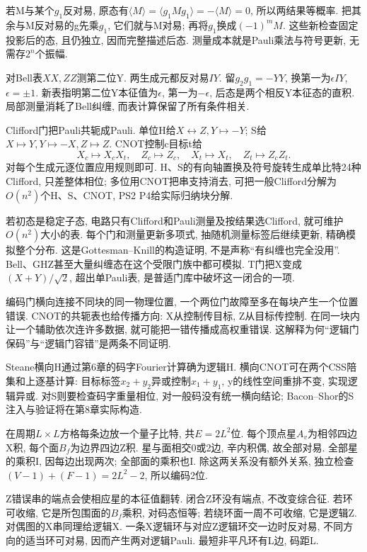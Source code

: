 若M与某个$g_1$反对易, 原态有$\langle M\rangle=\langle g_1Mg_1\rangle=-\langle M\rangle=0$, 所以两结果等概率. 把其余与M反对易的g先乘$g_1$, 它们就与M对易; 再将$g_1$换成$(-1)^mM$. 这些新检查固定投影后的态, 且仍独立, 因而完整描述后态. 测量成本就是Pauli乘法与符号更新, 无需存$2^n$个振幅.

\begin{example}对Bell表$XX,ZZ$测第二位Y. 两生成元都反对易$IY$. 留$g_2g_1=-YY$, 换第一为$\epsilon IY$, $\epsilon=\pm1$. 新表指明第二位Y本征值为$\epsilon$, 第一为$-\epsilon$, 后态是两个相反Y本征态的直积. 局部测量消耗了Bell纠缠, 而表计算保留了所有条件相关.\end{example}

Clifford门把Pauli共轭成Pauli. 单位H给$X\leftrightarrow Z,Y\mapsto-Y$; S给$X\mapsto Y,Y\mapsto-X,Z\mapsto Z$. CNOT控制c目标t给
\[X_c\mapsto X_cX_t,\quad Z_c\mapsto Z_c,\quad
X_t\mapsto X_t,\quad Z_t\mapsto Z_cZ_t.\]
对每个生成元逐位置应用规则即可. H、S的有向轴置换及符号旋转生成单比特24种Clifford, 只差整体相位; 多位用CNOT把串支持消去, 可把一般Clifford分解为$O(n^2)$个H、S、CNOT, PS2 P4给实际归纳块分解.

若初态是稳定子态, 电路只有Clifford和Pauli测量及按结果选Clifford, 就可维护$O(n^2)$大小的表. 每个门和测量更新多项式, 抽随机测量标签后继续更新, 精确模拟整个分布. 这是Gottesman--Knill的构造证明, 不是声称“有纠缠也完全没用”. Bell、GHZ甚至大量纠缠态在这个受限门族中都可模拟. T门把X变成$(X+Y)/\sqrt2$, 超出单Pauli表, 是普适门库中破坏这一闭合的一项.

编码门横向连接不同块的同一物理位置, 一个两位门故障至多在每块产生一个位置错误. CNOT的共轭表也给传播方向: X从控制传目标, Z从目标传控制. 在同一块内让一个辅助依次连许多数据, 就可能把一错传播成高权重错误. 这解释为何“逻辑门保码”与“逻辑门容错”是两条不同证明.

Steane横向H通过第6章的码字Fourier计算确为逻辑H. 横向CNOT可在两个CSS陪集和上逐基计算: 目标标签$x_2+y_2$异或控制$x_1+y_1$, y的线性空间重排不变, 实现逻辑异或. 对S则要检查码字重量相位, 对一般码没有统一横向结论; Bacon--Shor的S注入与验证将在第8章实际构造.

在周期$L\times L$方格每条边放一个量子比特, 共$E=2L^2$位. 每个顶点星$A_v$为相邻四边X积, 每个面$B_f$为边界四边Z积. 星与面相交0或2边, 辛内积偶, 故全部对易. 全部星的乘积I, 因每边出现两次; 全部面的乘积也I. 除这两关系没有额外关系, 独立检查$(V-1)+(F-1)=2L^2-2$, 所以编码2位.

Z错误串的端点会使相应星的本征值翻转. 闭合Z环没有端点, 不改变综合征. 若环可收缩, 它是所包围面的$B_f$乘积, 对码态恒等; 若绕环面一周不可收缩, 它是逻辑Z. 对偶图的X串同理给逻辑X. 一条X逻辑环与对应Z逻辑环交一边时反对易, 不同方向的适当环可对易, 因而产生两对逻辑Pauli. 最短非平凡环有L边, 码距L.


